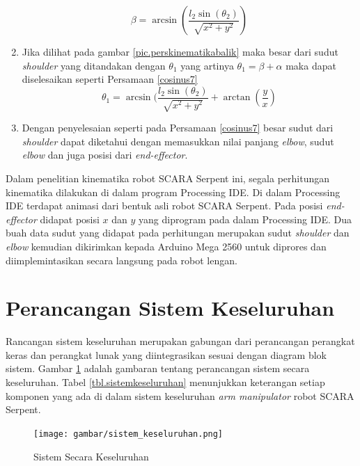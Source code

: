 \begin{enumerate}
	\begin{equation}
	\beta=\arcsin(\frac{l_{2}\sin(\theta_{2})}{\sqrt{x^2+y^2}})
	\label{cosinus6}
	\end{equation}
	\item Jika dilihat pada gambar \ref{pic.perskinematikabalik} maka besar dari sudut \textit{shoulder} yang ditandakan dengan $\theta_{1}$ yang artinya $\theta_{1}=\beta+\alpha$ maka dapat diselesaikan seperti Persamaan \ref{cosinus7}
	\begin{equation}
	\theta_{1}=\arcsin(\frac{l_{2}\sin(\theta_{2})}{\sqrt{x^2+y^2}}+\arctan(\frac{y}{x})
	\label{cosinus7}
	\end{equation}
	\item  Dengan penyelesaian seperti pada Persamaan \ref{cosinus7} besar sudut dari \textit{shoulder} dapat diketahui dengan memasukkan nilai panjang \textit{elbow}, sudut \textit{elbow} dan juga posisi dari \textit{end-effector}.
\end{enumerate}

Dalam penelitian kinematika robot SCARA Serpent ini, segala perhitungan kinematika dilakukan di dalam program Processing IDE. Di dalam Processing IDE terdapat animasi dari bentuk asli robot SCARA Serpent. Pada posisi \textit{end-effector} didapat posisi $x$ dan $y$ yang diprogram pada dalam Processing IDE. Dua buah data sudut yang didapat pada perhitungan merupakan sudut \textit{shoulder} dan \textit{elbow} kemudian dikirimkan kepada Arduino Mega 2560 untuk diprores dan diimplemintasikan secara langsung pada robot lengan.

\section{Perancangan Sistem Keseluruhan}
Rancangan sistem keseluruhan merupakan gabungan dari perancangan perangkat keras dan perangkat lunak yang diintegrasikan sesuai dengan diagram blok sistem. Gambar \ref{pic.sistemkeseluruhan} adalah gambaran tentang perancangan sistem secara keseluruhan. Tabel \ref{tbl.sistemkeseluruhan}  menunjukkan keterangan setiap komponen yang ada di dalam sistem keseluruhan \textit{arm manipulator} robot SCARA Serpent. 
\begin{figure}[H]
	\centering
	\texttt{[image: gambar/sistem\_keseluruhan.png]}
	\caption{Sistem Secara Keseluruhan}
	\label{pic.sistemkeseluruhan}
\end{figure}

